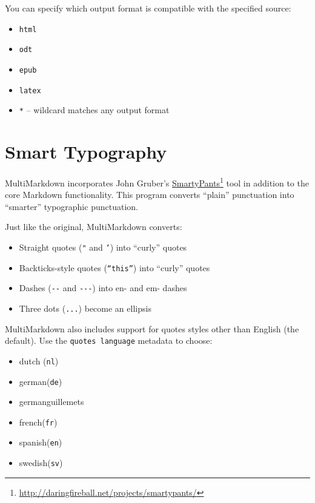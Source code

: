 You can specify which output format is compatible with the specified source:

\begin{itemize}
\item \texttt{html}

\item \texttt{odt}

\item \texttt{epub}

\item \texttt{latex}

\item \texttt{*} -- wildcard matches any output format

\end{itemize}

\section{Smart Typography}
\label{smarttypography}

MultiMarkdown incorporates John Gruber's \href{http://daringfireball.net/projects/smartypants/}{SmartyPants}\footnote{\href{http://daringfireball.net/projects/smartypants/}{http:\slash{}\slash{}daringfireball.net\slash{}projects\slash{}smartypants\slash{}}} tool in addition to the core Markdown functionality. This program converts ``plain'' punctuation into ``smarter'' typographic punctuation.

Just like the original, MultiMarkdown converts:

\begin{itemize}
\item Straight quotes (\texttt{"} and \texttt{'}) into ``curly'' quotes

\item Backticks-style quotes (\texttt{``this''}) into ``curly'' quotes

\item Dashes (\texttt{-{}-} and \texttt{-{}-{}-}) into en- and em- dashes

\item Three dots (\texttt{...}) become an ellipsis

\end{itemize}

MultiMarkdown also includes support for quotes styles other than English (the default). Use the \texttt{quotes language} metadata to choose:

\begin{itemize}
\item dutch (\texttt{nl})

\item german(\texttt{de})

\item germanguillemets

\item french(\texttt{fr})

\item spanish(\texttt{en})

\item swedish(\texttt{sv})

\end{itemize}

